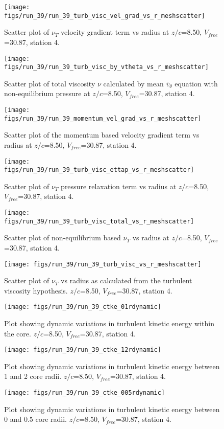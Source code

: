 \begin{figure}[H]
\centering
\texttt{[image: figs/run\_39/run\_39\_turb\_visc\_vel\_grad\_vs\_r\_meshscatter]}
\caption{Scatter plot of $\nu_T$ velocity gradient term vs radius at $z/c$=8.50, $V_{free}$=30.87, station 4.}
\end{figure}


\begin{figure}[H]
\centering
\texttt{[image: figs/run\_39/run\_39\_turb\_visc\_by\_vtheta\_vs\_r\_meshscatter]}
\caption{Scatter plot of total viscosity $\nu$ calculated by mean $\bar{v}_{\theta}$ equation with non-equilibrium pressure at $z/c$=8.50, $V_{free}$=30.87, station 4.}
\end{figure}


\begin{figure}[H]
\centering
\texttt{[image: figs/run\_39/run\_39\_momentum\_vel\_grad\_vs\_r\_meshscatter]}
\caption{Scatter plot of the momentum based velocity gradient term vs radius at $z/c$=8.50, $V_{free}$=30.87, station 4.}
\end{figure}


\begin{figure}[H]
\centering
\texttt{[image: figs/run\_39/run\_39\_turb\_visc\_ettap\_vs\_r\_meshscatter]}
\caption{Scatter plot of $\nu_T$ pressure relaxation term vs radius at $z/c$=8.50, $V_{free}$=30.87, station 4.}
\end{figure}


\begin{figure}[H]
\centering
\texttt{[image: figs/run\_39/run\_39\_turb\_visc\_total\_vs\_r\_meshscatter]}
\caption{Scatter plot of non-equilibrium based $\nu_T$ vs radius at $z/c$=8.50, $V_{free}$=30.87, station 4.}
\end{figure}


\begin{figure}[H]
\centering
\texttt{[image: figs/run\_39/run\_39\_turb\_visc\_vs\_r\_meshscatter]}
\caption{Scatter plot of $\nu_T$ vs radius as calculated from the turbulent viscosity hypothesis. $z/c$=8.50, $V_{free}$=30.87, station 4.}
\end{figure}


\begin{figure}[H]
\centering
\texttt{[image: figs/run\_39/run\_39\_ctke\_01rdynamic]}
\caption{Plot showing dynamic variations in turbulent kinetic energy within the core. $z/c$=8.50, $V_{free}$=30.87, station 4.}
\end{figure}


\begin{figure}[H]
\centering
\texttt{[image: figs/run\_39/run\_39\_ctke\_12rdynamic]}
\caption{Plot showing dynamic variations in turbulent kinetic energy between 1 and 2 core radii. $z/c$=8.50, $V_{free}$=30.87, station 4.}
\end{figure}


\begin{figure}[H]
\centering
\texttt{[image: figs/run\_39/run\_39\_ctke\_005rdynamic]}
\caption{Plot showing dynamic variations in turbulent kinetic energy between 0 and 0.5 core radii. $z/c$=8.50, $V_{free}$=30.87, station 4.}
\end{figure}


